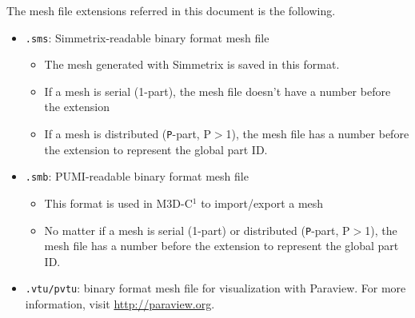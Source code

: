 The mesh file extensions referred in this document is the following.
\begin{itemize}
\item	\texttt{.sms}: Simmetrix-readable binary format mesh file
\begin{itemize}
\item	The mesh generated with Simmetrix is saved in this format.
\item	If a mesh is serial (1-part), the mesh file doesn't have a number before the extension
\item	If a mesh is distributed (\texttt{P}-part, P$>$1), the mesh file has a number before the extension to represent the global part ID.
\end{itemize}
\item	\texttt{.smb}: PUMI-readable binary format mesh file
\begin{itemize}
\item	This format is used in M3D-C$^{1}$ to import/export a mesh
\item	No matter if a mesh is serial (1-part) or distributed (\texttt{P}-part, P$>$1), the mesh file has a number before the extension to represent the global part ID.
\end{itemize}
\item \texttt{.vtu/pvtu}: binary format mesh file for visualization with Paraview. For more information, visit \href{http://paraview.org}{http://paraview.org}.
\end{itemize}

